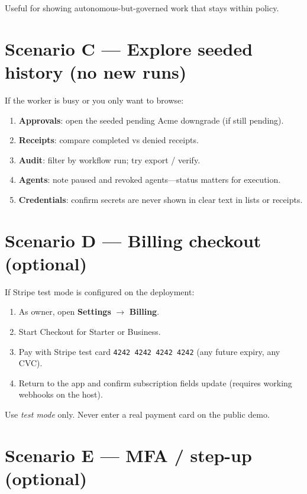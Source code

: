 \documentclass[11pt,a4paper]{article}
\newcommand{\ui}[1]{\textbf{#1}}
\begin{document}
Useful for showing autonomous-but-governed work that stays within policy.

\section{Scenario C --- Explore seeded history (no new runs)}

If the worker is busy or you only want to browse:

\begin{enumerate}[leftmargin=1.3em]
  \item \ui{Approvals}: open the seeded pending Acme downgrade (if still pending).
  \item \ui{Receipts}: compare completed vs denied receipts.
  \item \ui{Audit}: filter by workflow run; try export / verify.
  \item \ui{Agents}: note paused and revoked agents---status matters for execution.
  \item \ui{Credentials}: confirm secrets are never shown in clear text in lists
        or receipts.
\end{enumerate}

\section{Scenario D --- Billing checkout (optional)}

If Stripe test mode is configured on the deployment:

\begin{enumerate}[leftmargin=1.3em]
  \item As owner, open \ui{Settings} $\rightarrow$ \ui{Billing}.
  \item Start Checkout for Starter or Business.
  \item Pay with Stripe test card \texttt{4242 4242 4242 4242}
        (any future expiry, any CVC).
  \item Return to the app and confirm subscription fields update
        (requires working webhooks on the host).
\end{enumerate}

\begin{warningbox}
  Use \emph{test mode} only. Never enter a real payment card on the public demo.
\end{warningbox}

\section{Scenario E --- MFA / step-up (optional)}
\end{document}

